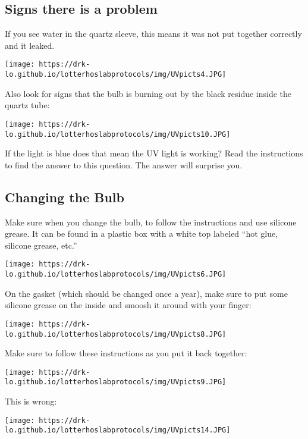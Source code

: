 \documentclass[
  letterpaper,
  DIV=11,
  numbers=noendperiod]{scrreprt}
\begin{document}
\hypertarget{signs-there-is-a-problem}{%
\subsection*{\texorpdfstring{\textbf{Signs there is a
problem}}{Signs there is a problem}}\label{signs-there-is-a-problem}}

If you see water in the quartz sleeve, this means it was not put
together correctly and it leaked.

\texttt{[image: https://drk-lo.github.io/lotterhoslabprotocols/img/UVpicts4.JPG]}

Also look for signs that the bulb is burning out by the black residue
inside the quartz tube:

\texttt{[image: https://drk-lo.github.io/lotterhoslabprotocols/img/UVpicts10.JPG]}

If the light is blue does that mean the UV light is working? Read the
instructions to find the answer to this question. The answer will
surprise you.

\hypertarget{changing-the-bulb}{%
\subsection*{\texorpdfstring{\textbf{Changing the
Bulb}}{Changing the Bulb}}\label{changing-the-bulb}}

Make sure when you change the bulb, to follow the instructions and use
silicone grease. It can be found in a plastic box with a white top
labeled ``hot glue, silicone grease, etc.''

\texttt{[image: https://drk-lo.github.io/lotterhoslabprotocols/img/UVpicts6.JPG]}

On the gasket (which should be changed once a year), make sure to put
some silicone grease on the inside and smoosh it around with your
finger:

\texttt{[image: https://drk-lo.github.io/lotterhoslabprotocols/img/UVpicts8.JPG]}

Make sure to follow these instructions as you put it back together:

\texttt{[image: https://drk-lo.github.io/lotterhoslabprotocols/img/UVpicts9.JPG]}

This is wrong:

\texttt{[image: https://drk-lo.github.io/lotterhoslabprotocols/img/UVpicts14.JPG]}
\end{document}
